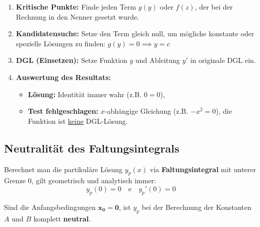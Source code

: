 \begin{enumerate}
    \item \textbf{Kritische Punkte:} 
    Finde jeden Term $g(y)$ oder $f(z)$, der bei der Rechnung in den Nenner gesetzt wurde.
    \item \textbf{Kandidatensuche:}
    Setze den Term gleich null, um mögliche konstante oder spezielle Lösungen zu finden: $g(y) = 0 \implies y = c $
    
    \item \textbf{DGL (Einsetzen):}
    Setze Funktion $y$ und Ableitung $y'$ in originale DGL ein.
    
    \item \textbf{Auswertung des Resultats:}
    \begin{itemize}
        \item \textbf{Lösung:} Identität immer wahr (z.B. $0 = 0$),  
    
        \item \textbf{Test fehlgeschlagen:} $x$-abhängige Gleichung (z.B. $-x^2 = 0$), die Funktion ist \underline{keine} DGL-Lösung.
\end{itemize}
\end{enumerate}

\subsection{Neutralität des Faltungsintegrals}
Berechnet man die partikuläre Lösung $y_p(x)$ via \textbf{Faltungsintegral} mit unterer Grenze $0$, gilt geometrisch und analytisch immer:
\[ y_p(0) = 0 \quad \text{e} \quad y_p'(0) = 0 \]

Sind die Anfangsbedingungen $\mathbf{x_0 = 0}$, ist $y_p$ bei der Berechnung der Konstanten $A$ und $B$ komplett \textbf{neutral}.
